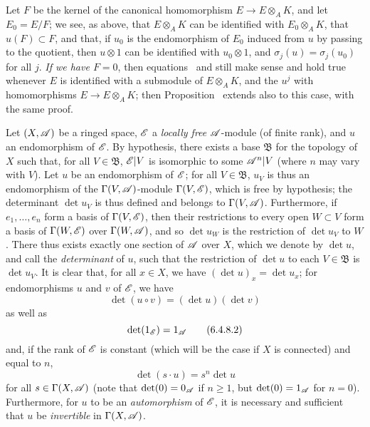 \begin{remark}[6.4.7]
Let $F$ be the kernel of the canonical homomorphism $E\to E\otimes_A K$, and let $E_0=E/F$;
we see, as above, that $E\otimes_A K$ can be identified with $E_0\otimes_A K$, that $u(F)\subset F$, and that, if $u_0$ is the endomorphism of $E_0$ induced from $u$ by passing to the quotient, then $u\otimes1$ can be identified with $u_0\otimes1$, and $\sigma_j(u)=\sigma_j(u_0)$ for all $j$.
\emph{If we have $F=0$}, then equations~ and  still make sense and hold true whenever $E$ is identified with a submodule of $E\otimes_A K$, and the $u^j$ with homomorphisms $E\to E\otimes_A K$;
then Proposition~ extends also to this case, with the same proof.
\end{remark}

\begin{env}[6.4.8]
\label{II.6.4.8}
Let $(X,\mathscr{A})$ be a ringed space, $\mathscr{E}$ a \emph{locally free} $\mathscr{A}$-module (of finite rank), and $u$ an endomorphism of $\mathscr{E}$.
By hypothesis, there exists a base $\mathfrak{B}$ for the topology of $X$ such that, for all $V\in\mathfrak{B}$, $\mathscr{E}|V$ is isomorphic to some $\mathscr{A}^n|V$ (where $n$ may vary with $V$).
Let $u$ be an endomorphism of $\mathscr{E}$;
for all $V\in\mathfrak{B}$, $u_V$ is thus an endomorphism of the $\Gamma(V,\mathscr{A})$-module $\Gamma(V,\mathscr{E})$, which is free by hypothesis;
the determinant $\det u_V$ is thus defined and belongs to $\Gamma(V,\mathscr{A})$.
Furthermore, if $e_1,\ldots,e_n$ form a basis of $\Gamma(V,\mathscr{E})$, then their restrictions to every open $W\subset V$ form a basis of $\Gamma(W,\mathscr{E})$ over $\Gamma(W,\mathscr{A})$, and so $\det u_W$ is the restriction of $\det u_V$ to $W$.
There thus exists exactly one section of $\mathscr{A}$ over $X$, which we denote by $\det u$, and call the \emph{determinant} of $u$, such that the restriction of $\det u$ to each $V\in\mathfrak{B}$ is $\det u_V$.
It is clear that, for all $x\in X$, we have $(\det u)_x=\det u_x$;
for endomorphisms $u$ and $v$ of $\mathscr{E}$, we have
\[
\label{II.6.4.8.1}
  \det(u\circ v) = (\det u)(\det v)
\tag{6.4.8.1}
\]
as well as
\[
\label{II.6.4.8.2}
  \det(1_{\mathscr{E}}) = 1_{\mathscr{A}}
\tag{6.4.8.2}
\]
and, if the rank of $\mathscr{E}$ is constant (which will be the case  if $X$ is connected) and equal to $n$,
\[
\label{II.6.4.8.3}
  \det(s\cdot u) = s^n\det u
\tag{6.4.8.3}
\]
for all $s\in\Gamma(X,\mathscr{A})$ (note that $\det(0)=0_{\mathscr{A}}$ if $n\geq1$, but $\det(0)=1_{\mathscr{A}}$ for $n=0$).
Furthermore, for $u$ to be an \emph{automorphism} of $\mathscr{E}$, it is necessary and sufficient that $u$ be \emph{invertible} in $\Gamma(X,\mathscr{A})$.


\end{env}
